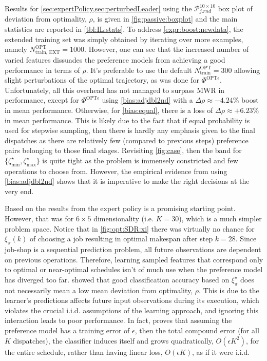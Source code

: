 \documentclass[twocolumn]{svjour3}
\newcommand{\bigOh}[1]{{O}\left(#1\right)}
\newcommand{\namerho}{deviation from optimality, $\rho$}
\newcommand{\Problem}[2][ ]{$\mathcal{P}_{#2}^{#1}$}
\newcommand{\jrnd}[2]{\Problem[#1 \times #2]{j.rnd}}
\begin{document}
Results for \cref{sec:expertPolicy,sec:perturbedLeader} using the \jrnd{10}{10} 
box plot of \namerho, is given in \cref{fig:passive:boxplot} and the main 
statistics are reported in \cref{tbl:IL:stats}. 
To address \ref{expr:boost:newdata}, the extended training set was simply 
obtained by iterating over more examples, namely $N^{\text{OPT}}_{\text{train, 
EXT}}=1000$. However, one can see that the increased number of varied features 
dissuades the preference models from achieving a good performance in terms of 
$\rho$. 
It's preferable to use the default $N^{\text{OPT}}_{\text{train}}=300$ 
allowing slight perturbations of the optimal trajectory, as was done for 
$\Phi^{\text{OPT}\epsilon}$. Unfortunately, all this overhead has not managed 
to surpass MWR in performance, except for $\Phi^{\text{OPT}\epsilon}$ using 
\ref{bias:adjdbl2nd} with a $\Delta\rho\approx-4.24\%$ boost in mean 
performance. Otherwise, for \ref{bias:equal}, there is a loss of 
$\Delta\rho\approx+6.23\%$ in mean performance. 
This is likely due to the fact that if equal probability is used for stepwise 
sampling, then there is hardly any emphasis given to the final dispatches as 
there are relatively few (compared to previous steps) preference pairs 
belonging to those final stages.
Revisiting \cref{fig:case}, then the band for 
$\{\zeta^{\star}_{\min},\zeta^{\star}_{\max}\}$ is quite tight as the problem 
is immensely constricted and few operations to choose from. However, the 
empirical evidence from using \ref{bias:adjdbl2nd} shows that it is 
imperative to make the right decisions at the very end.

Based on the results from \cite{InRu11a} the expert policy is a promising 
starting point.
However, that was for $6\times5$ dimensionality (i.e. $K=30$), which is a much 
simpler problem space. Notice that in \cref{fig:opt:SDR:xi} there was 
virtually no chance for $\xi_\pi(k)$ of choosing a job resulting in optimal 
makespan after step $k=28$.
Since job-shop is a sequential prediction problem, all future observations are 
dependent on previous operations. 
Therefore, learning sampled features that correspond only to optimal or 
near-optimal schedules isn't of much use when the preference model has 
diverged too far.  showed that good classification 
accuracy based on $\xi^\star_\pi$ does not necessarily mean a low mean \namerho.
This is due to the learner's predictions affects future input observations 
during its execution, which violates the crucial i.i.d. assumptions of the 
learning approach, and ignoring this interaction leads to poor performance.
In fact, \cite{RossB10} proves that assuming the preference model has a 
training error of $\epsilon$, then the total compound error (for all $K$ 
dispatches), the classifier induces itself and grows quadratically, 
$\bigOh{\epsilon K^2}$, for the entire schedule, rather than having linear 
loss, $\bigOh{\epsilon K}$, as if it were i.i.d.
\end{document}
